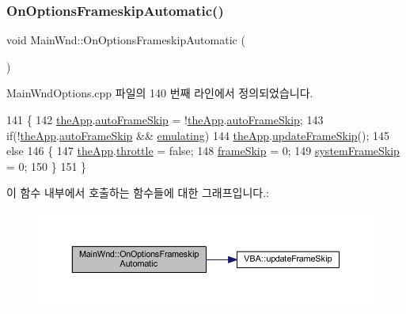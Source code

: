 \subsubsection{\texorpdfstring{On\+Options\+Frameskip\+Automatic()}{OnOptionsFrameskipAutomatic()}}
{\footnotesize\ttfamily void Main\+Wnd\+::\+On\+Options\+Frameskip\+Automatic (\begin{DoxyParamCaption}{ }\end{DoxyParamCaption})\hspace{0.3cm}{\ttfamily [protected]}}



Main\+Wnd\+Options.\+cpp 파일의 140 번째 라인에서 정의되었습니다.


\begin{DoxyCode}
141 \{
142   \mbox{\hyperlink{_v_b_a_8cpp_a8095a9d06b37a7efe3723f3218ad8fb3}{theApp}}.\mbox{\hyperlink{class_v_b_a_a9ecbee7d82db73b24aee3afb66128388}{autoFrameSkip}} = !\mbox{\hyperlink{_v_b_a_8cpp_a8095a9d06b37a7efe3723f3218ad8fb3}{theApp}}.\mbox{\hyperlink{class_v_b_a_a9ecbee7d82db73b24aee3afb66128388}{autoFrameSkip}};
143   \textcolor{keywordflow}{if}(!\mbox{\hyperlink{_v_b_a_8cpp_a8095a9d06b37a7efe3723f3218ad8fb3}{theApp}}.\mbox{\hyperlink{class_v_b_a_a9ecbee7d82db73b24aee3afb66128388}{autoFrameSkip}} && \mbox{\hyperlink{_main_wnd_options_8cpp_af9cc36078b1b311753963297ae7f2a74}{emulating}})
144       \mbox{\hyperlink{_v_b_a_8cpp_a8095a9d06b37a7efe3723f3218ad8fb3}{theApp}}.\mbox{\hyperlink{class_v_b_a_a2b3524193d398b041e90907430361ed8}{updateFrameSkip}}();
145   \textcolor{keywordflow}{else}
146   \{
147       \mbox{\hyperlink{_v_b_a_8cpp_a8095a9d06b37a7efe3723f3218ad8fb3}{theApp}}.\mbox{\hyperlink{class_v_b_a_af21b98509a2589b38e4787f065b40a2b}{throttle}} = \textcolor{keyword}{false};
148       \mbox{\hyperlink{_globals_8cpp_a668e22999d7fcea3ed14130fd680b795}{frameSkip}} = 0;
149       \mbox{\hyperlink{system_8cpp_ac88aa402d015fda6917b150c22a28968}{systemFrameSkip}} = 0;
150   \}
151 \}
\end{DoxyCode}
이 함수 내부에서 호출하는 함수들에 대한 그래프입니다.\+:
\nopagebreak
\begin{figure}[H]
\begin{center}
\leavevmode
\includegraphics[width=350pt]{class_main_wnd_aafb7bdce8ddf0dbe3420c1f5fcd9fd62_cgraph}
\end{center}
\end{figure}
\mbox{\label{class_main_wnd_aa16e562b5f9e456543112253588f57be}} 
